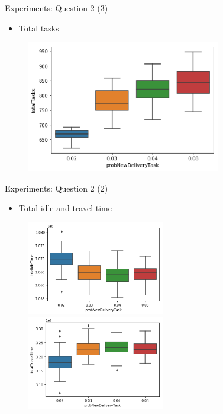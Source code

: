 \begin{frame}{Experiments: Question 2 (3)}
    \begin{itemize}
        \item Total tasks
    \end{itemize}

    \begin{figure}[!hbt]
        \centering
        \includegraphics[width=8.5cm]{imgs/question2-plot3}
    \end{figure}
\end{frame}

\begin{frame}{Experiments: Question 2 (2)}
    \begin{itemize}
        \item Total idle and travel time
    \end{itemize}

    \begin{figure}[!hbt]
        \begin{adjustbox}{center}
            \includegraphics[width=6cm]{imgs/question2-plot1}
            \includegraphics[width=6cm]{imgs/question2-plot2}
        \end{adjustbox}
    \end{figure}
\end{frame}


